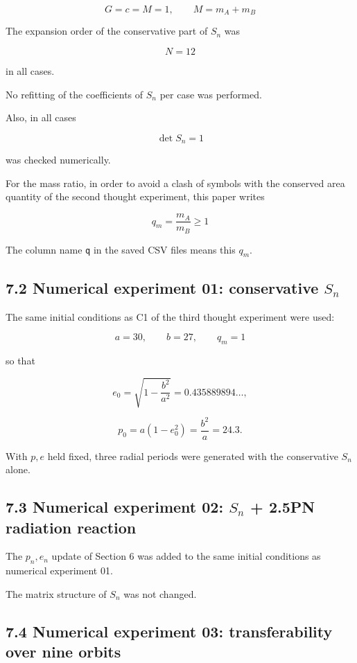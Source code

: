 \documentclass[
  a4paper,
]{article}
\begin{document}
\[
G=c=M=1,
\qquad
M=m_A+m_B
\]

The expansion order of the conservative part of \(S_n\) was

\[
N=12
\]

in all cases.

No refitting of the coefficients of \(S_n\) per case was performed.

Also, in all cases

\[
\det S_n=1
\]

was checked numerically.

For the mass ratio, in order to avoid a clash of symbols with the
conserved area quantity of the second thought experiment, this paper
writes

\[
q_m=\frac{m_A}{m_B}\ge1
\]

The column name \texttt{q} in the saved CSV files means this \(q_m\).

\subsection{\texorpdfstring{7.2 Numerical experiment 01: conservative
\(S_n\)}{7.2 Numerical experiment 01: conservative S\_n}}\label{numerical-experiment-01-conservative-s_n}

The same initial conditions as C1 of the third thought experiment were
used:

\[
a=30,
\qquad b=27,
\qquad q_m=1
\]

so that

\[
e_0
=\sqrt{1-\frac{b^2}{a^2}}
=0.435889894\ldots,
\]

\[
p_0=a(1-e_0^2)=\frac{b^2}{a}=24.3.
\]

With \(p,e\) held fixed, three radial periods were generated with the
conservative \(S_n\) alone.

\subsection{\texorpdfstring{7.3 Numerical experiment 02: \(S_n\) + 2.5PN
radiation
reaction}{7.3 Numerical experiment 02: S\_n + 2.5PN radiation reaction}}\label{numerical-experiment-02-s_n-2.5pn-radiation-reaction}

The \(p_n,e_n\) update of Section 6 was added to the same initial
conditions as numerical experiment 01.

The matrix structure of \(S_n\) was not changed.

\subsection{7.4 Numerical experiment 03: transferability over nine
orbits}\label{numerical-experiment-03-transferability-over-nine-orbits}
\end{document}
